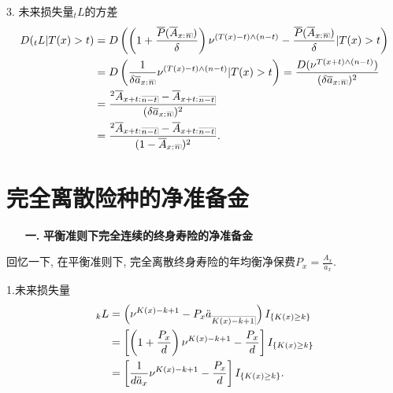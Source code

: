 \documentclass[a4paper,openany, 10pt]{ctexbook}
\makeatletter
\newcommand{\hei}{\CJKfamily{hei}}      %
\def\z{\left}
\def\y{\right}
\DeclareRobustCommand{\annu}[1]{_{%
    \def\arraystretch{0}%
    \setlength\arraycolsep{1pt}%
    \setlength\arrayrulewidth{.2pt}%
    \begin{array}[b]{@{}c|}\hline
        \\[\arraycolsep]%
        \scriptstyle #1%
    \end{array}%
}}
\makeatother
\begin{document}
3. 未来损失量${}_tL$的方差
\begin{align*}
    D(_tL|T(x)>t) &=D\z(\z(1+\frac{\overline P(\overline A_{x:}{}\annu n)}{\delta}\y)\nu^{(T(x)-t)\land(n-t)}-\frac{\overline P(\overline A_{x:}{}\annu n)}{\delta}|T(x)>t\y)\\
                        &=D\z(\frac{1}{\delta\overline a_{x:}{}\annu n}\nu^{(T(x)-t)\land(n-t)}|T(x)>t\y)=\frac{D(\nu^{T(x+t)\land(n-t)})}{(\delta\overline a_{x:}{}\annu n)^2}\\
                        &=\frac{^2\overline A_{x+t:}{}\annu {n-t}-\overline A_{x+t:}{}\annu {n-t}}{(\delta \overline a_{x:}{}\annu {n})^2}\\
                        &=\frac{^2\overline A_{x+t:}{}\annu {n-t}-\overline A_{x+t:}{}\annu {n-t}}{(1- \overline A_{x:}{}\annu {n})^2}.
                                       \end{align*}

\section{完全离散险种的净准备金}

\begin{itemize}
    \item[{\bf\hei 一.}]{\bf\hei 平衡准则下完全连续的终身寿险的净准备金}
\end{itemize}
回忆一下, 在平衡准则下, 完全离散终身寿险的年均衡净保费$P_x=\frac{A_x}{\ddot a_x}.$


1.未来损失量
\begin{align*}
    {}_kL&=\z(\nu^{K(x)-k+1}-P_x \ddot a_{\annu {K(x)-k+1}}\y)I_{\{K(x)\ge k\}} \\
                        &=\z[\z(1+\frac{P_x }{d}\y)\nu^{K(x)-k+1}-\frac{P_x}{d}\y] I_{\{K(x)\ge k\}}\\
                        &=\z[\frac{1}{d\ddot a_x}\nu^{K(x)-k+1}-\frac{P_x }{d}\y]I_{\{K(x)\ge k\}}.
\end{align*}
\end{document}
